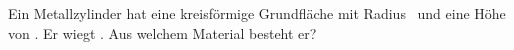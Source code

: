 Ein Metallzylinder hat eine kreisförmige Grundfläche mit Radius \rZyO\ und eine Höhe von \hZyO. Er wiegt \mZyO. Aus welchem Material besteht er?
